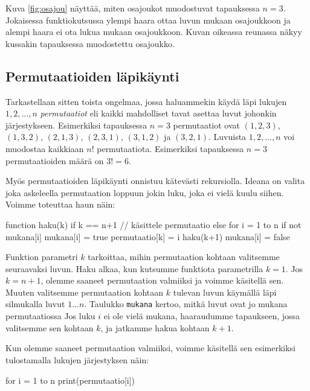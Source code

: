 Kuva \ref{fig:osajou} näyttää,
miten osajoukot muodostuvat tapauksessa $n=3$.
Jokaisessa funktiokutsussa ylempi haara ottaa luvun mukaan osajoukkoon
ja alempi haara ei ota lukua mukaan osajoukkoon.
Kuvan oikeassa reunassa näkyy kussakin tapauksessa muodostettu osajoukko.

\subsection{Permutaatioiden läpikäynti}


Tarkastellaan sitten toista ongelmaa, jossa haluammekin
käydä läpi lukujen $1,2,\dots,n$ \emph{permutaatiot}
eli kaikki mahdolliset tavat asettaa luvut johonkin järjestykseen.
Esimerkiksi tapauksessa $n=3$ permutaatiot ovat
$(1,2,3)$, $(1,3,2)$, $(2,1,3)$, $(2,3,1)$, $(3,1,2)$ ja $(3,2,1)$.
Luvuista $1,2,\dots,n$ voi muodostaa kaikkiaan $n!$ permutaatiota.
Esimerkiksi tapauksessa $n=3$ permutaatioiden määrä on
$3!=6$.

Myös permutaatioiden läpikäynti onnistuu kätevästi rekursiolla.
Ideana on valita joka askeleella permutaation loppuun
jokin luku, joka ei vielä kuulu siihen.
Voimme toteuttaa haun näin:

\begin{code}
function haku(k)
    if k == n+1
        // käsittele permutaatio
    else
        for i = 1 to n
            if not mukana[i]
                mukana[i] = true
                permutaatio[k] = i
                haku(k+1)
                mukana[i] = false
\end{code}

Funktion parametri $k$ tarkoittaa, mihin permutaation kohtaan
valitsemme seuraavaksi luvun.
Haku alkaa, kun kutsumme funktiota parametrilla $k=1$.
Jos $k=n+1$, olemme saaneet permutaation valmiiksi
ja voimme käsitellä sen.
Muuten valitsemme permutaation kohtaan $k$ tulevan luvun
käymällä läpi silmukalla luvut $1 \dots n$.
Taulukko \texttt{mukana} kertoo, mitkä luvut
ovat jo mukana permutaatiossa
Jos luku $i$ ei ole vielä mukana, haaraudumme tapaukseen,
jossa valitsemme sen kohtaan $k$, ja jatkamme hakua kohtaan $k+1$.

Kun olemme saaneet permutaation valmiiksi,
voimme käsitellä sen esimerkiksi tulostamalla lukujen
järjestyksen näin:

\begin{code}
for i = 1 to n
    print(permutaatio[i])
\end{code}

